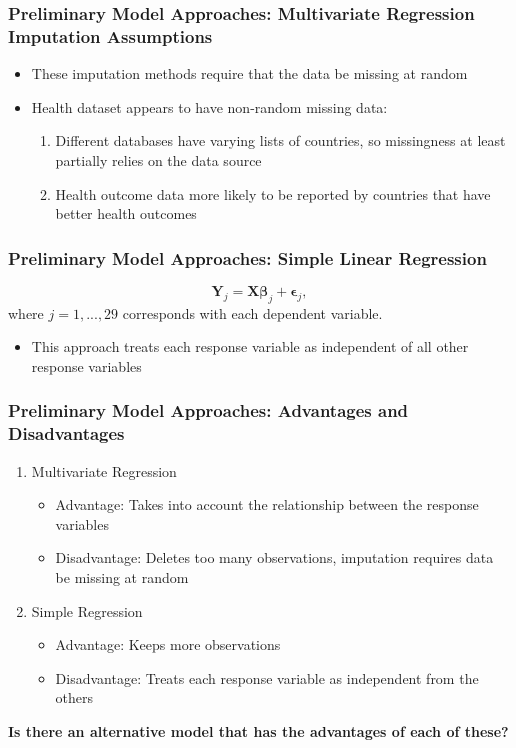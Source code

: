 \documentclass{beamer}
\begin{document}
\begin{frame}
\frametitle{Preliminary Model Approaches: Multivariate Regression \\ \normalsize{Imputation Assumptions}}
\begin{itemize}
\item These imputation methods require that the data be missing at random
\item Health dataset appears to have non-random missing data:
\begin{enumerate}
\item Different databases have varying lists of countries, so missingness at least partially relies on the data source
\item Health outcome data more likely to be reported by countries that have better health outcomes
\end{enumerate}
\end{itemize}
\end{frame}

\begin{frame}
\frametitle{Preliminary Model Approaches: Simple Linear Regression}
\begin{equation}
\mathbf{Y}_j = \mathbf{X}\boldsymbol{\beta}_j + \boldsymbol{\epsilon}_j,
\end{equation}
where $j=1,...,29$ corresponds with each dependent variable.
\begin{itemize}
\item This approach treats each response variable as independent of all other response variables
\end{itemize}
\end{frame}

\begin{frame}
\frametitle{Preliminary Model Approaches: Advantages and Disadvantages}
\begin{enumerate}
\item Multivariate Regression
\begin{itemize}
\item Advantage: Takes into account the relationship between the response variables
\item Disadvantage: Deletes too many observations, imputation requires data be missing at random
\end{itemize}
\item Simple Regression
\begin{itemize}
\item Advantage: Keeps more observations
\item Disadvantage: Treats each response variable as independent from the others
\end{itemize}
\end{enumerate}
\textbf{Is there an alternative model that has the advantages of each of these?}
\end{frame}
\end{document}
